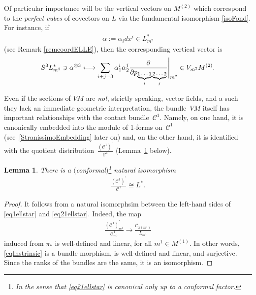 \documentclass[pdftex]{sigma}
\newcommand{\C}{\mathcal{C}}
\numberwithin{equation}{section}
\newtheorem{Lemma}[Theorem]{Lemma}
\begin{document}
\begin{Example}
Of particular importance will be the vertical vectors on $M^{(2)}$ which correspond to the \emph{perfect cubes} of covectors on $L$ via the fundamental isomorphism \eqref{isoFond}. For instance, if
\begin{gather}\label{EqCoordAlpha}
\alpha:=\alpha_idx^i\in L_{m^2}^\ast
\end{gather}
(see Remark \ref{remcoordELLE}), then the corresponding vertical vector is
\begin{gather}\label{isoFondCoord}
S^3L_{m^2}^\ast\ni\alpha^{\otimes 3}\longleftrightarrow \sum_{i+j=3} \alpha_1^i\alpha_2^j \frac{\partial }{\partial p_{\underbrace{\text{\scriptsize $1\cdots 1$}}_{i} \underbrace{\text{\scriptsize $2\cdots 2$}}_{j}}} \Bigg|_{ {m}^{2}}\in V_{m^2}M^{(2)}.
\end{gather}
\end{Example}

Even if the sections of $VM$ are \emph{not}, strictly speaking, vector f\/ields, and a such they lack an immediate geometric interpretation, the bundle~$VM$ itself has important relationships with the contact bundle~$\C^1$. Namely, on one hand, it is canonically embedded into the module of 1-forms on~$\C^1$ (see~\eqref{StranissimoEmbedding} later on) and, on the other hand, it is identif\/ied with the quotient distribution~$\frac{(\C^1)^\prime}{\C^1}$ (Lemma~\ref{lemmaStupidoMaCarino} below).

\begin{Lemma}\label{lemmaStupidoMaCarino}
There is a $($conformal$)$\footnote{In the sense that \eqref{eq21ellstar} is canonical only up to a conformal factor.} natural isomorphism
\begin{gather}\label{eq21ellstar}
\frac{(\C^1)^\prime}{\C^1}\cong L^\ast.
\end{gather}
\end{Lemma}

\begin{proof}
It follows from a natural isomorphsim between the left-hand sides of \eqref{eq1ellstar} and \eqref{eq21ellstar}. Indeed, the map
\begin{gather}\label{eqInstrinsic}
\frac{(\C^1)^\prime_{m^1}}{\C^1_{m^1}}\longrightarrow \frac{\C_{\pi(m^1)}}{L_{m^1}}
\end{gather}
induced from $\pi_\ast$ is well-def\/ined and linear, for all $m^1\in M^{(1)}$. In other words, \eqref{eqInstrinsic} is a bundle morphism, is well-def\/ined and linear, and surjective. Since the ranks of the bundles are the same, it is an isomorphism.
\end{proof}
\end{document}
